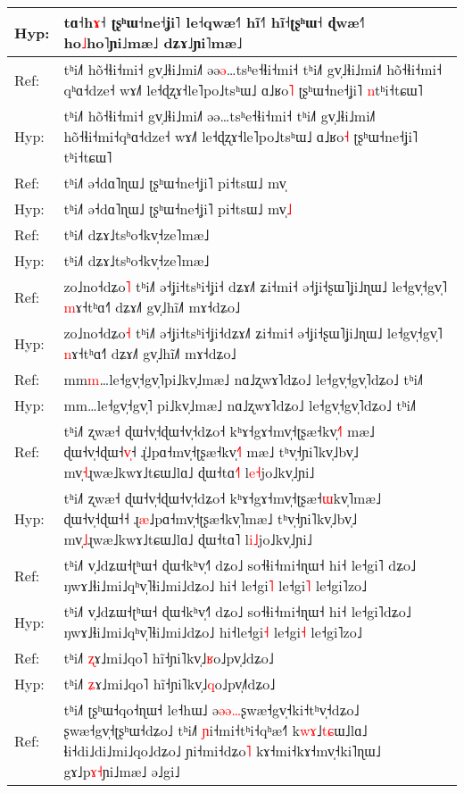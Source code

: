 \documentclass[10pt]{article}
\DeclareRobustCommand{\hl}[1]{{\textcolor{red}{#1}}}
\begin{document}
\begin{longtable}{ll}
Hyp: & tɑ˧h\hl{ɤ}˧ ʈʂʰɯ˧ne˧ʝi˥ le˧qwæ˧˥ hĩ˧\hl{˥}\hl{ }hĩ˧ʈʂʰɯ˧ ɖwæ˧˥ ho\hl{˩}ho˥ɲi˩mæ˩ dʑɤ˩ɲi˥mæ˩ \\ 
\midrule 
Ref: & tʰi˩˥ hõ˧ɬi˧mi˧ gv̩˩ɬi˩mi˩˥ əə\hl{ə}…tsʰe˧ɬi˧mi˧ tʰi˩˥ gv̩˩ɬi˩mi˩˥ hõ˧ɬi˧mi˧\hl{ }qʰɑ˧dze˧ wɤ˩˥ le˧ɖʐɤ˧le˥po˩tsʰɯ˩ ɑ˩ʁo\hl{˥} ʈʂʰɯ˧ne˧ʝi˥ \hl{n}tʰi˧tɕɯ˥ \\ 
Hyp: & tʰi˩˥ hõ˧ɬi˧mi˧ gv̩˩ɬi˩mi˩˥ əə…tsʰe˧ɬi˧mi˧ tʰi˩˥ gv̩˩ɬi˩mi˩˥ hõ˧ɬi˧mi˧qʰɑ˧dze˧ wɤ˩˥ le˧ɖʐɤ˧le˥po˩tsʰɯ˩ ɑ˩ʁo\hl{˧} ʈʂʰɯ˧ne˧ʝi˥ tʰi˧tɕɯ˥ \\ 
\midrule 
Ref: & tʰi˩˥ ə˧dɑ˥ɳɯ˩ ʈʂʰɯ˧ne˧ʝi˥ pi˧tsɯ˩ mv̩ \\ 
Hyp: & tʰi˩˥ ə˧dɑ˥ɳɯ˩ ʈʂʰɯ˧ne˧ʝi˥ pi˧tsɯ˩ mv̩\hl{˩} \\ 
\midrule 
Ref: & tʰi˩˥ dʑɤ˩tsʰo˧kv̩˧ze˥mæ˩ \\ 
Hyp: & tʰi˩˥ dʑɤ˩tsʰo˧kv̩˧ze˥mæ˩ \\ 
\midrule 
Ref: & zo˩no˧dʑo\hl{˥} tʰi˩˥ ə˧ʝi˧tsʰi˧ʝi˧\hl{ }dʑɤ˩˥ ʑi˧mi˧ ə˧ʝi˧ʂɯ˥ʝi˩ɳɯ˩ le˧gv̩˧gv̩˥ \hl{m}ɤ˧tʰɑ˧˥ dʑɤ˩˥ gv̩˩hĩ˩˥ mɤ˧dʑo˩ \\ 
Hyp: & zo˩no˧dʑo\hl{˧} tʰi˩˥ ə˧ʝi˧tsʰi˧ʝi˧dʑɤ˩˥ ʑi˧mi˧ ə˧ʝi˧ʂɯ˥ʝi˩ɳɯ˩ le˧gv̩˧gv̩˥ \hl{n}ɤ˧tʰɑ˧˥ dʑɤ˩˥ gv̩˩hĩ˩˥ mɤ˧dʑo˩ \\ 
\midrule 
Ref: & mm\hl{m}…le˧gv̩˧gv̩˥pi˩kv̩˩mæ˩ nɑ˩ʐwɤ˥dʑo˩ le˧gv̩˧gv̩˥dʑo˩ tʰi˩˥ \\ 
Hyp: & mm…le˧gv̩˧gv̩˥\hl{ }pi˩kv̩˩mæ˩ nɑ˩ʐwɤ˥dʑo˩ le˧gv̩˧gv̩˥dʑo˩ tʰi˩˥ \\ 
\midrule 
Ref: & tʰi˩˥ ʐwæ˧ ɖɯ˧v̩˧ɖɯ˧v̩˧dʑo˧ kʰɤ˧gɤ˧mv̩˧ʈʂæ˧kv̩\hl{˧}˥\hl{ }mæ˩ ɖɯ˧v̩˧ɖɯ˧\hl{v}\hl{̩}˧ ɻ\hl{̍}˩pɑ˧mv̩˧ʈʂæ˧kv̩\hl{˧}˥\hl{ }mæ˩ tʰv̩˧ɲi˥kv̩˩bv̩˩ mv̩\hl{˧}ɻwæ˩kwɤ˩tɕɯ˩lɑ˩ ɖɯ˧tɑ\hl{˧}˥ l\hl{e}\hl{˧}jo˩kv̩˩ɲi˩ \\ 
Hyp: & tʰi˩˥ ʐwæ˧ ɖɯ˧v̩˧ɖɯ˧v̩˧dʑo˧ kʰɤ˧gɤ˧mv̩˧ʈʂæ˧\hl{ɯ}kv̩˥mæ˩ ɖɯ˧v̩˧ɖɯ˧˧ ɻ\hl{æ}˩pɑ˧mv̩˧ʈʂæ˧kv̩˥mæ˩ tʰv̩˧ɲi˥kv̩˩bv̩˩ mv̩\hl{˩}ɻwæ˩kwɤ˩tɕɯ˩lɑ˩ ɖɯ˧tɑ˥ l\hl{i}\hl{˩}jo˩kv̩˩ɲi˩ \\ 
\midrule 
Ref: & tʰi˩˥ v̩˩dʑɯ˧ʈʰɯ˧ ɖɯ˧kʰv̩˧˥ dʑo˩ so˧ɬi˧mi˧ɳɯ˧ hi˧ le˧gi˥\hl{ }dʑo˩ ŋwɤ˩ɬi˩mi˩qʰv̩˥ɬi˩mi˩dʑo˩ hi˧\hl{ }le˧gi\hl{˥} le˧gi\hl{˥} le˧gi˥zo˩ \\ 
Hyp: & tʰi˩˥ v̩˩dʑɯ˧ʈʰɯ˧ ɖɯ˧kʰv̩˧˥ dʑo˩ so˧ɬi˧mi˧ɳɯ˧ hi˧ le˧gi˥dʑo˩ ŋwɤ˩ɬi˩mi˩qʰv̩˥ɬi˩mi˩dʑo˩ hi˧le˧gi\hl{˧} le˧gi\hl{˧} le˧gi˥zo˩ \\ 
\midrule 
Ref: & tʰi˩˥ \hl{ʐ}ɤ˩mi˩qo˥ hĩ˧ɲi˥kv̩˩\hl{ʁ}o˩pv̩˩dʑo˩ \\ 
Hyp: & tʰi˩˥ \hl{ʑ}ɤ˩mi˩qo˥ hĩ˧ɲi˥kv̩˩\hl{q}o˩pv̩˩\hl{˥}dʑo˩ \\ 
\midrule 
Ref: & tʰi˩˥ ʈʂʰɯ˧qo˧ɳɯ˧ le˧hɯ˩ ə\hl{ə}\hl{ə}\hl{…}ʂwæ˧gv̩˧ki˧tʰv̩˧dʑo˩ ʂwæ˧gv̩˧ʈʂʰɯ˧dʑo˩ tʰi˩˥ \hl{ɲ}i˧mi˧tʰi˧qʰæ˧˥ k\hl{w}\hl{ɤ}˩\hl{t}\hl{ɕ}ɯ˩lɑ˩ ɬi˧di˩di˩mi˩qo˩dʑo˩ ɲi˧mi˧dʑo\hl{˥} kɤ˧mi˧kɤ˧mv̩˧ki˥ɳɯ˩ gɤ˩p\hl{ɤ}\hl{˧}ɲi˩mæ˩ ə˩gi˩ \\ 

\end{longtable}
\end{document}
